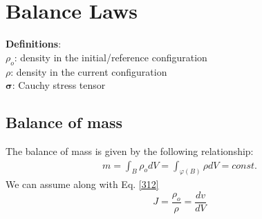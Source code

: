 \documentclass[12pt,3p]{article}
\numberwithin{equation}{section}
\begin{document}
\section{Balance Laws}
\textbf{Definitions}: \\
$\rho_o$: density in the initial/reference configuration \\
$\rho$: density in the current configuration \\
$\pmb{\sigma}$: Cauchy stress tensor \\

\subsection{Balance of mass}
The balance of mass is given by the following relationship:
\begin{align}\label{337}
m = \int_{B} \rho_o dV = \int_{\varphi(B)} \rho dV = const. 
\end{align}
We can assume along with Eq. \ref{312}
\begin{equation}\label{338}
J = \frac{\rho_o}{\rho} = \frac{dv}{dV}
\end{equation}
\end{document}
